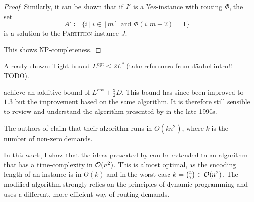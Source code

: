 \begin{proof}
	Similarly, it can be shown that if $J'$ is a Yes-instance with routing $\Phi$, the set 
	\begin{equation}
		A' \coloneqq \{i \ |\ i \in [m] \text{ and } \Phi(i, m+2) = 1\}
	\end{equation} 
	is a solution to the \textsc{Partition} instance $J$.
	
	This shows NP-completeness.
\end{proof}




Already shown: Tight bound $L^\mathrm{opt} \leq 2 L^\ast$ (take references from däubel intro!! TODO).

\citet{schrijver99} achieve an additive bound of $L^\mathrm{opt} + \frac{3}{2}D$.
This bound has since been improved to $1.3$ but the improvement based on the same algorithm.
It is therefore still sensible to review and understand the algorithm presented by \citet{schrijver99} in the late 1990s.

The authors of \cite{schrijver99} claim that their algorithm runs in $O(k n^2)$, where $k$ is the number of non-zero demands.

In this work, I show that the ideas presented by \citet{schrijver99} can be extended to an algorithm that has a time-complexity in $\mathcal{O}(n^2)$.
This is almost optimal, as the encoding length of an instance is in $\Theta(k)$ and in the worst case $k = \binom{n}{2} \in \mathcal{O}(n^2)$.
The modified algorithm strongly relies on the principles of dynamic programming and uses a different, more efficient way of routing demands.


